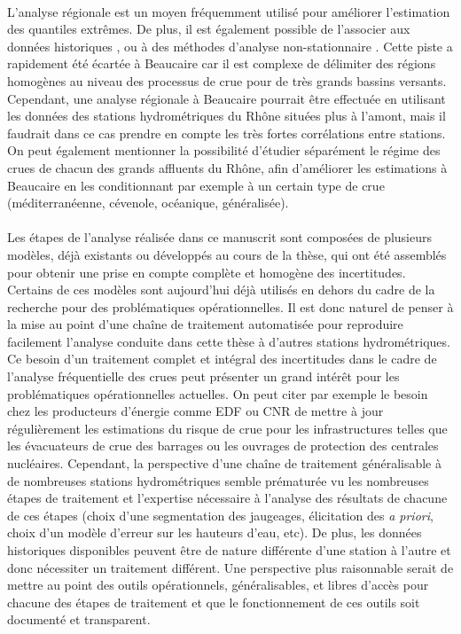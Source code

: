 		\paragraph{} L'analyse régionale est un moyen fréquemment utilisé pour améliorer l'estimation des quantiles extrêmes. De plus, il est également possible de l'associer aux données historiques \citep{gaume_bayesian_2010}, ou à des méthodes d'analyse non-stationnaire \citep{han_incorporating_2022}. Cette piste a rapidement été écartée à Beaucaire car il est complexe de délimiter des régions homogènes au niveau des processus de crue pour de très grands bassins versants. Cependant, une analyse régionale à Beaucaire pourrait être effectuée en utilisant les données des stations hydrométriques du Rhône situées plus à l'amont, mais il faudrait dans ce cas prendre en compte les très fortes corrélations entre stations. On peut également mentionner la possibilité d'étudier séparément le régime des crues de chacun des grands affluents du Rhône, afin d'améliorer les estimations à Beaucaire en les conditionnant par exemple à un certain type de crue (méditerranéenne, cévenole, océanique, généralisée).
			
		\paragraph{} Les étapes de l'analyse réalisée dans ce manuscrit sont composées de plusieurs modèles, déjà existants ou développés au cours de la thèse, qui ont été assemblés pour obtenir une prise en compte complète et homogène des incertitudes. Certains de ces modèles sont aujourd'hui déjà utilisés en dehors du cadre de la recherche pour des problématiques opérationnelles. Il est donc naturel de penser à la mise au point d'une chaîne de traitement automatisée pour reproduire facilement l'analyse conduite dans cette thèse à d'autres stations hydrométriques. Ce besoin d'un traitement complet et intégral des incertitudes dans le cadre de l'analyse fréquentielle des crues peut présenter un grand intérêt pour les problématiques opérationnelles actuelles. On peut citer par exemple le besoin chez les producteurs d'énergie comme EDF ou CNR de mettre à jour régulièrement les estimations du risque de crue pour les infrastructures telles que les évacuateurs de crue des barrages ou les ouvrages de protection des centrales nucléaires. Cependant, la perspective d'une chaîne de traitement généralisable à de nombreuses stations hydrométriques semble prématurée vu les nombreuses étapes de traitement et l'expertise nécessaire à l'analyse des résultats de chacune de ces étapes (choix d'une segmentation des jaugeages, élicitation des \textit{a priori}, choix d'un modèle d'erreur sur les hauteurs d'eau, etc). De plus, les données historiques disponibles peuvent être de nature différente d'une station à l'autre et donc nécessiter un traitement différent. Une perspective plus raisonnable serait de mettre au point des outils opérationnels, généralisables, et libres d'accès pour chacune des étapes de traitement et que le fonctionnement de ces outils soit documenté et transparent. 
	
